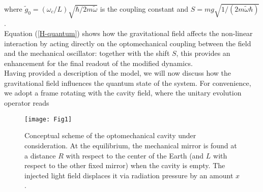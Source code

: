 \documentclass[aps,twocolumn,preprintnumbers,amsmath,amssymb]{revtex4}
\begin{document}
where $\tilde{g}_0=(\omega_c/L)\sqrt{\hbar/2m\tilde{\omega}}$ is the coupling constant and $S=mg\sqrt{1/(2m\tilde{\omega}\hbar)}$.\\
Equation (\ref{H-quantum}) shows how the gravitational field affects the non-linear interaction by acting directly on the optomechanical coupling between the field and the mechanical oscillator: together with the shift $S$, this provides an enhancement for the final readout of the modified dynamics.\\
Having provided a description of the model, we will now discuss how the gravitational field influences the quantum state of the system.
For convenience, we adopt a frame rotating with the cavity field, where the unitary evolution operator reads \cite{bose1997}
\begin{figure}[h!]
\centering
\texttt{[image: Fig1]}
\caption{Conceptual scheme of the optomechanical cavity under consideration. At the equilibrium, the mechanical mirror is found at a distance $R$ with respect to the center of the Earth (and $L$ with respect to the other fixed mirror) when the cavity is empty. The injected light field displaces it via radiation pressure by an amount $x$.
\label{Model}}
\end{figure}
\end{document}
